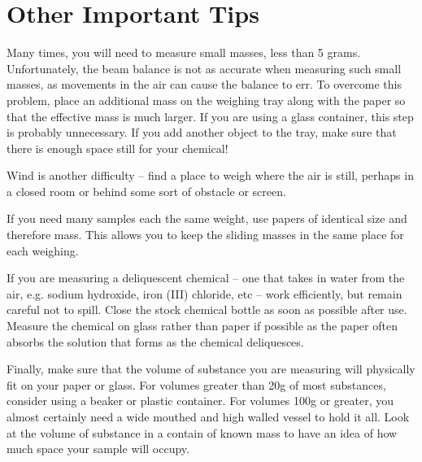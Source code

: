 \section{Other Important Tips}

Many times, you will need to measure small masses, less than 5 grams. Unfortunately, the beam balance is not as accurate when measuring such small masses, as movements in the air can cause the balance to err. To overcome this problem, place an additional mass on the weighing tray along with the paper so that the effective mass is much larger. If you are using a glass container, this step is probably unnecessary. If you add another object to the tray, make sure that there is enough space still for your chemical!

Wind is another difficulty – find a place to weigh where the air is still, perhaps in a closed room or behind some sort of obstacle or screen.

If you need many samples each the same weight, use papers of identical size and therefore mass. This allows you to keep the sliding masses in the same place for each weighing.

If you are measuring a deliquescent chemical – one that takes in water from the air, e.g. sodium hydroxide, iron (III) chloride, etc – work efficiently, but remain careful not to spill. Close the stock chemical bottle as soon as possible after use. Measure the chemical on glass rather than paper if possible as the paper often absorbs the solution that forms as the chemical deliquesces.

Finally, make sure that the volume of substance you are measuring will physically fit on your paper or glass. For volumes greater than 20g of most substances, consider using a beaker or plastic container. For volumes 100g or greater, you almost certainly need a wide mouthed and high walled vessel to hold it all. Look at the volume of substance in a contain of known mass to have an idea of how much space your sample will occupy.
